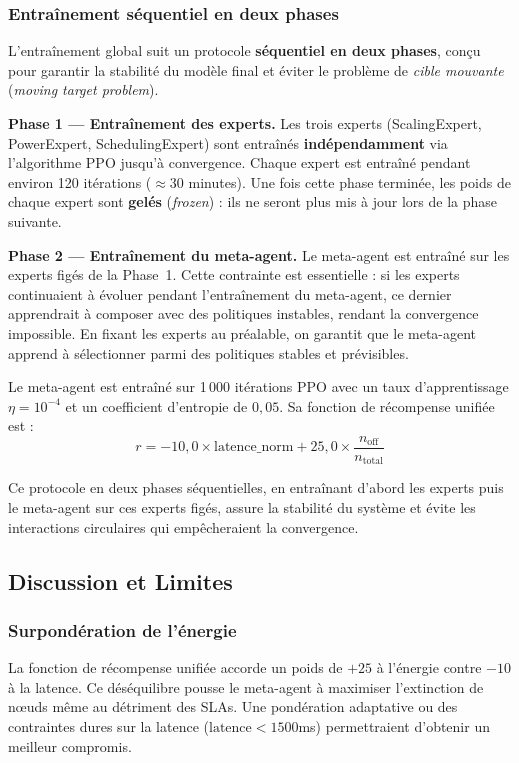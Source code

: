\subsubsection{Entraînement séquentiel en deux phases}

L'entraînement global suit un protocole \textbf{séquentiel en deux phases}, conçu pour garantir la stabilité du modèle final et éviter le problème de \textit{cible mouvante} (\textit{moving target problem}).

\textbf{Phase 1 --- Entraînement des experts.}
Les trois experts (ScalingExpert, PowerExpert, SchedulingExpert) sont entraînés \textbf{indépendamment} via l'algorithme PPO jusqu'à convergence. Chaque expert est entraîné pendant environ 120 itérations ($\approx 30$ minutes). Une fois cette phase terminée, les poids de chaque expert sont \textbf{gelés} (\textit{frozen}) : ils ne seront plus mis à jour lors de la phase suivante.

\textbf{Phase 2 --- Entraînement du meta-agent.}
Le meta-agent est entraîné sur les experts figés de la Phase~1. Cette contrainte est essentielle : si les experts continuaient à évoluer pendant l'entraînement du meta-agent, ce dernier apprendrait à composer avec des politiques instables, rendant la convergence impossible. En fixant les experts au préalable, on garantit que le meta-agent apprend à sélectionner parmi des politiques stables et prévisibles.

Le meta-agent est entraîné sur 1\,000 itérations PPO avec un taux d'apprentissage $\eta = 10^{-4}$ et un coefficient d'entropie de $0{,}05$. Sa fonction de récompense unifiée est :
\[
r = -10{,}0 \times \text{latence\_norm} + 25{,}0 \times \frac{n_{\text{off}}}{n_{\text{total}}}
\]

Ce protocole en deux phases séquentielles, en entraînant d'abord les experts puis le meta-agent sur ces experts figés, assure la stabilité du système et évite les interactions circulaires qui empêcheraient la convergence.

\subsection{Discussion et Limites}

\subsubsection{Surpondération de l'énergie}

La fonction de récompense unifiée accorde un poids de $+25$ à l'énergie
contre $-10$ à la latence. Ce déséquilibre pousse le meta-agent à maximiser
l'extinction de nœuds même au détriment des SLAs. Une pondération
adaptative ou des contraintes dures sur la latence ($\text{latence} < 1500$ms)
permettraient d'obtenir un meilleur compromis.

